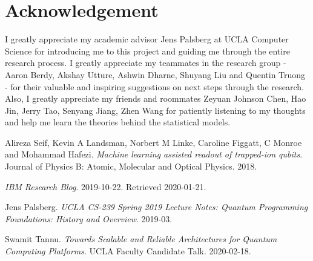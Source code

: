 \documentclass[letterpaper,twocolumn,10pt]{article}
\begin{document}
\section{Acknowledgement}

I greatly appreciate my academic advisor Jens Palsberg at UCLA Computer Science for introducing me to this project and guiding me through the entire research process. I greatly appreciate my teammates in the research group - Aaron Berdy, Akshay Utture, Ashwin Dharne, Shuyang Liu and Quentin Truong - for their valuable and inspiring suggestions on next steps through the research. Also, I greatly appreciate my friends and roommates Zeyuan Johnson Chen, Hao Jin, Jerry Tao, Senyang Jiang, Zhen Wang for patiently listening to my thoughts and help me learn the theories behind the statistical models. 

\begin{thebibliography}{9}
    Alireza Seif, Kevin A Landsman, Norbert M Linke, Caroline Figgatt, C Monroe and Mohammad Hafezi.
    \textit{Machine learning assisted readout of trapped-ion qubits}. 
    Journal of Physics B: Atomic, Molecular and Optical Physics. 2018.

    \textit{IBM Research Blog}. 
    2019-10-22. Retrieved 2020-01-21.

    Jens Palsberg.
    \textit{UCLA CS-239 Spring 2019 Lecture Notes: Quantum Programming Foundations: History and Overview}.
    2019-03.

    Swamit Tannu.
    \textit{Towards Scalable and Reliable Architectures for Quantum Computing Platforms}.
    UCLA Faculty Candidate Talk. 2020-02-18.
\end{thebibliography}
\end{document}
